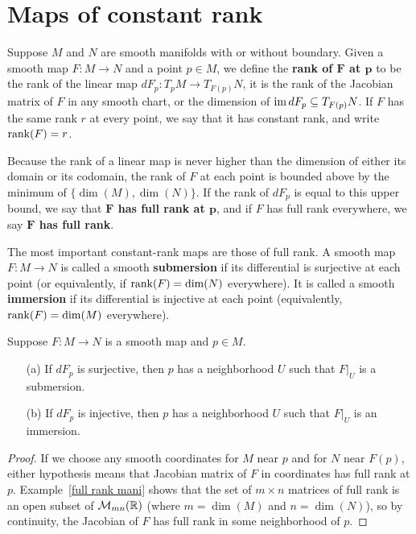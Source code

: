 \section{Maps of constant rank}
Suppose $M$ and $N$ are smooth manifolds with or without boundary. Given a smooth map $F:M\to N$ and a point $p\in M$, we define the \textbf{rank of $\bm{F}$ at $\bm{p}$} to be the rank of the linear map $dF_p:T_pM\to T_{F(p)}N$, it is the rank of the Jacobian matrix of $F$ in any smooth chart, or the dimension of $\mathrm{im}\, dF_p\subseteq T_{F(p)}N$. If $F$ has the same rank $r$ at every point, we say that it has constant rank, and write $\mathrm{rank}(F)=r$.\par
Because the rank of a linear map is never higher than the dimension of either its domain or its codomain, the rank of $F$ at each point is bounded above by the minimum of $\{\dim(M), \dim(N)\}$. If the rank of $dF_p$ is equal to this upper bound, we say that \textbf{$\bm{F}$ has full rank at $\bm{p}$}, and if $F$ has full rank everywhere, we say \textbf{$\bm{F}$ has full rank}.\par
The most important constant-rank maps are those of full rank. A smooth map $F:M\to N$ is called a smooth \textbf{submersion} if its differential is surjective at each point (or equivalently, if $\mathrm{rank}(F)=\dim(N)$ everywhere). It is called a smooth \textbf{immersion} if its differential is injective at each point (equivalently, $\mathrm{rank}(F)=\dim(M)$ everywhere).\par
\begin{proposition}\label{local immersion subm}
Suppose $F:M\to N$ is a smooth map and $p\in M$.
\begin{itemize}
\item[(a)] If $dF_p$ is surjective, then $p$ has a neighborhood $U$ such that $F|_U$ is a submersion.
\item[(b)] If $dF_p$ is injective, then $p$ has a neighborhood $U$ such that $F|_U$ is an immersion.
\end{itemize}
\end{proposition}
\begin{proof}
If we choose any smooth coordinates for $M$ near $p$ and for $N$ near $F(p)$, either hypothesis means that Jacobian matrix of $F$ in coordinates has full rank at $p$. Example~\ref{full rank mani} shows that the set of $m\times n$ matrices of full rank is an open subset of $\mathcal{M}_{mn}(\mathbb{R})$ (where $m=\dim(M)$ and $n=\dim(N)$), so by continuity, the Jacobian of $F$ has full rank in some neighborhood of $p$.
\end{proof}
